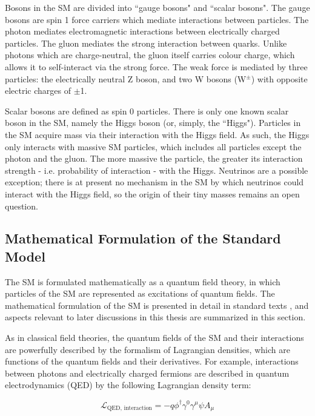 Bosons in the SM are divided into ``gauge bosons" and ``scalar bosons". The gauge bosons are spin 1 force carriers which mediate interactions between particles. The photon mediates electromagnetic interactions between electrically charged particles. The gluon mediates the strong interaction between quarks. Unlike photons which are charge-neutral, the gluon itself carries colour charge, which allows it to self-interact via the strong force. The weak force is mediated by three particles: the electrically neutral Z boson, and two W bosons (W$^\pm$) with opposite electric charges of $\pm$1. 

Scalar bosons are defined as spin 0 particles. There is only one known scalar boson in the SM, namely the Higgs boson (or, simply, the ``Higgs"). Particles in the SM acquire mass via their interaction with the Higgs field. As such, the Higgs only interacts with massive SM particles, which includes all particles except the photon and the gluon. The more massive the particle, the greater its interaction strength - i.e. probability of interaction - with the Higgs. Neutrinos are a possible exception; there is at present no mechanism in the SM by which neutrinos could interact with the Higgs field, so the origin of their tiny masses remains an open question.  

\subsection{Mathematical Formulation of the Standard Model}

The SM is formulated mathematically as a quantum field theory, in which particles of the SM are represented as excitations of quantum fields. The mathematical formulation of the SM is presented in detail in standard texts \cite{Griffiths_2008, }, and aspects relevant to later discussions in this thesis are summarized in this section.

As in classical field theories, the quantum fields of the SM and their interactions are powerfully described by the formalism of Lagrangian densities, which are functions of the quantum fields and their derivatives. For example, interactions between photons and electrically charged fermions are described in quantum electrodynamics (QED) by the following Lagrangian density term:

\begin{equation}
\label{eq:qed_interaction}
\mathcal{L}_\text{QED, interaction} = -q\phi^\dagger\gamma^0\gamma^\mu\psi A_\mu
\end{equation}

